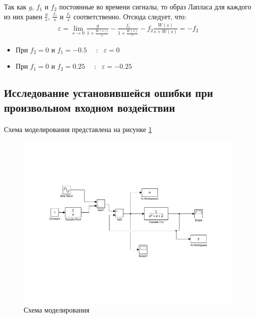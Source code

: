 \documentclass[a4paper,12pt]{article}
\begin{document}
	Так как $g$, $f_1$ и $f_2$ постоянные во времени сигналы, то образ Лапласа для каждого из них равен $\frac{g}{s}$, $\frac{f_1}{s}$ и $\frac{f_2}{s}$ соответственно. Отсюда следует, что: \\
	\begin{gather}	 
	\varepsilon=\lim\limits_{s\rightarrow 0}\displaystyle\frac{g}{\displaystyle 1+\frac{W(s))}{s}}-\displaystyle\frac{f_1}{\displaystyle 1+\frac{W(s)}{s}}-f_2\displaystyle\frac{W(s)}{s+W(s)}=-f_2
	\end{gather}
	\begin{itemize}
		\item При $f_2=0$ и $f_1=-0.5$ ~~:~ $\varepsilon=0$
		\item При $f_1=0$ и $f_2=0.25$ ~~:~ $\varepsilon=-0.25$
	\end{itemize}
	\newpage
	\begin{center}
		\section{Исследование установившейся ошибки при произвольном входном воздействии}
	\end{center}
	\paragraph {} Схема моделирования представлена на рисунке \ref{s_19}
	
	\begin{figure}[h]
		\renewcommand{\figurename}{Рисунок}
		\centering
		\includegraphics[width=6in]{OshibkaMOD.pdf}
		\caption{Схема моделирования}
		\label{s_19}
	\end{figure}
\end{document}
